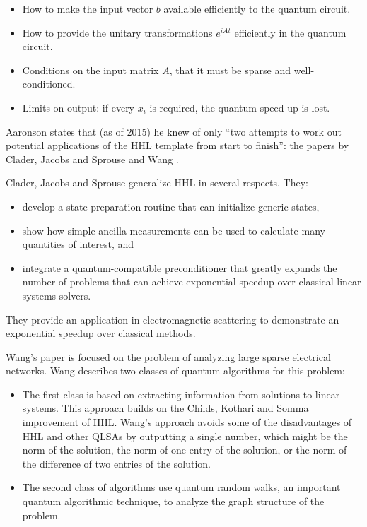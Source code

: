 \documentclass[12pt]{extarticle}
\begin{document}
\begin{itemize}
\item How to make the input vector $b$ available efficiently to the quantum circuit.
\item How to provide the unitary transformations $e^{iAt}$ efficiently in the quantum circuit.
\item Conditions on the input matrix $A$, that it must be sparse and well-conditioned.
\item Limits on output: if every $x_i$ is required, the quantum speed-up is lost.
\end{itemize}

Aaronson states that (as of 2015) he knew of only ``two attempts to work out potential applications of the HHL template from start to finish'':
the papers by Clader, Jacobs and Sprouse \cite{clader2013preconditioned} and Wang \cite{wang2017efficient}.

Clader, Jacobs and Sprouse generalize HHL in several respects. They:
\begin{itemize}
\item develop a state preparation routine that can initialize generic states,
\item show how simple ancilla measurements can be used to calculate many quantities of interest, and
\item integrate a quantum-compatible preconditioner that greatly expands the number of problems that can achieve exponential speedup over classical linear systems solvers.
\end{itemize}
They provide an application in electromagnetic scattering to demonstrate an exponential speedup over classical methods.

Wang's paper is focused on the problem of analyzing large sparse electrical networks.
Wang describes two classes of quantum algorithms for this problem:
\begin{itemize}
\item The first class is based on extracting information from solutions to linear systems.
This approach builds on the Childs, Kothari and Somma\cite{somma2016quantum} improvement of HHL.
Wang's approach avoids some of the disadvantages of HHL and other QLSAs by outputting a single number,
which might be the norm of the solution, the norm of one entry of the solution, or the norm of the difference of two entries of the solution.
\item The second class of algorithms use quantum random walks, an important quantum algorithmic technique,
to analyze the graph structure of the problem.
\end{itemize}
\end{document}
